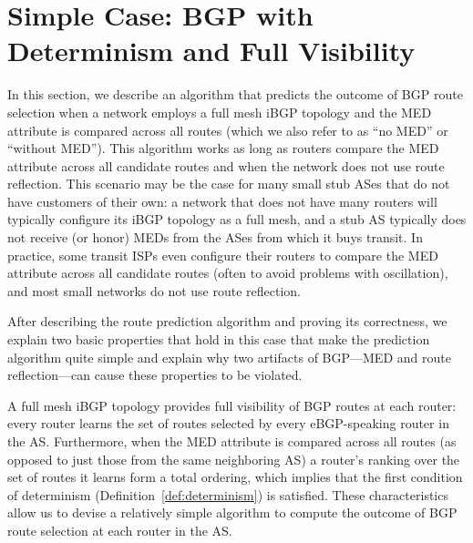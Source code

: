 \section{Simple Case: BGP with Determinism and Full Visibility }
\label{sec:egress_set}
\label{sec:simple}

In this section, we describe an algorithm that predicts the outcome of
BGP route selection 
when a network employs a full mesh iBGP topology and the MED attribute
is compared across all routes (which we also refer to as ``no MED'' or
``without MED'').  This algorithm works as long as routers compare the
MED attribute across all candidate routes and when the network does not
use route reflection.  This scenario may be the case for many small stub
ASes that do not have customers of their own: a network that does not
have many routers will typically configure its iBGP topology as a full
mesh, and a stub AS typically does not receive (or honor) MEDs from the
ASes from which it buys transit.  In practice, some transit ISPs even
configure their routers to compare the MED attribute across all
candidate routes (often to avoid problems with oscillation), and most
small networks do not use route reflection.

After describing the route prediction algorithm and proving its
correctness, we explain 
two basic properties that hold in this case that make the prediction
algorithm quite simple and explain why two artifacts of BGP---MED and
route reflection---can cause these properties to be violated.

A full mesh iBGP topology provides full visibility of BGP routes at each
router: every router learns the set of routes selected by every
eBGP-speaking router in the AS.
Furthermore, when the MED attribute is compared across all routes (as
opposed to just those from the same neighboring AS) a router's ranking
over the set of routes it learns form a total ordering, which implies
that the first condition of determinism
(Definition~\ref{def:determinism}) is satisfied.
These characteristics allow us to devise a relatively simple algorithm
to compute the outcome of BGP route selection at each router in the AS.


